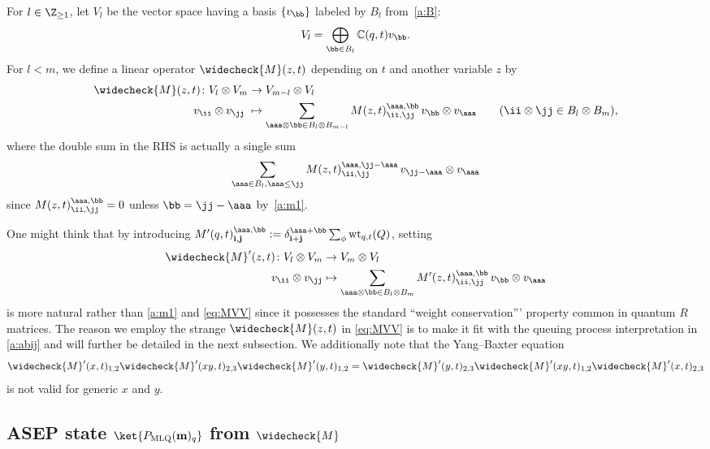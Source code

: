 For $l \in  \Z_{\ge 1}$, let $V_l$ be the vector space having a basis $\{v_\bb\}$ labeled by $B_l$ from~\ref{a:B}:
\begin{align}
V_l = \bigoplus_{\bb \in B_l}\mathbb{C}(q,t)v_\bb.
\end{align}
For $l<m$,  we define a linear operator 
$\widecheck{M}(z,t)$ depending on $t$ and another variable $z$ by
\begin{subequations}
\label{eq:MVV}
\begin{align}
\widecheck{M}(z,t)\colon V_l \otimes V_m & \rightarrow V_{m-l} \otimes V_l
\label{a:Mvv0} \\
v_\ii \otimes v_\jj \;&\mapsto
\sum_{\aaa \otimes \bb \in B_l \otimes B_{m-l}}
M(z,t)^{\aaa, \bb}_{\ii, \jj} \,v_\bb\otimes v_\aaa
\qquad 
(\ii \otimes \jj \in B_l \otimes B_m),
\label{a:Mvv}
\end{align}
\end{subequations}
where the double sum in the RHS is actually a single sum
\[
\sum_{\aaa  \in B_l, \aaa \le \jj} M(z,t)^{\aaa, \jj-\aaa}_{\ii, \jj} \,v_{\jj-\aaa}\otimes v_\aaa
\]
since $M(z,t)^{\aaa, \bb}_{\ii, \jj}=0$ unless $\bb=\jj-\aaa$ by~\eqref{a:m1}.

\begin{rema}
One might think that by introducing $M'(q,t)^{\aaa, \bb}_{{\bf i}, {\bf j}} := \delta^{\aaa+\bb}_{{\bf i} + {\bf j}}\sum_{\phi} \text{wt}_{q,t}(Q)$,  setting
\begin{align*}
\widecheck{M}'(z,t) \colon V_l \otimes V_m & \rightarrow V_m \otimes V_l
\\
v_{\ii} \otimes v_{\jj} & \mapsto \sum_{\aaa \otimes \bb \in B_l \otimes B_m} 
M'(z,t)^{\aaa, \bb}_{\ii, \jj} \,v_\bb\otimes v_\aaa
\end{align*}
is more natural rather than \eqref{a:m1} and \eqref{eq:MVV} since it possesses the standard ``weight conservation''' property common in quantum $R$ matrices.
The reason we employ the strange $\widecheck{M}(z,t)$ in \eqref{eq:MVV}
is to make it fit with the queuing process interpretation in \eqref{a:abij}
and will further be detailed in the next subsection.
We additionally note that the Yang--Baxter equation 
\[
\widecheck{M}'(x,t)_{1,2}\widecheck{M}'(x y,t)_{2,3}\widecheck{M}'(y,t)_{1,2} 
= \widecheck{M}'(y,t)_{2,3}\widecheck{M}'(x y,t)_{1,2}\widecheck{M}'(x,t)_{2,3}
\]
is not valid for generic $x$ and $y$.
\end{rema}

\subsection{ASEP state \texorpdfstring{$\ket{P_{\text{MLQ}}({\bf m})_q}$ from $\widecheck{M}$}{|PMLQ(m)\_q> from Mcheck}}

